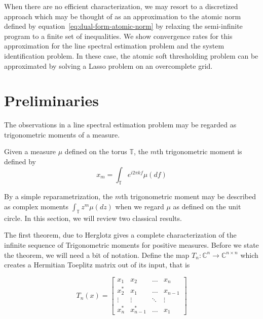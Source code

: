 When there are no efficient characterization, we may resort to a discretized
approach which may be thought of as an approximation to the atomic norm defined
by equation~\eqref{eq:dual-form-atomic-norm} by relaxing the semi-infinite
program to a finite set of inequalities. We show convergence rates for this
approximation for the line spectral estimation problem and the system
identification problem. In these case, the atomic soft thresholding problem can
be approximated by solving a Lasso problem on an overcomplete grid.


\section{Preliminaries} %
\label{sec:preliminaries}

The observations in a line spectral estimation problem may be regarded as
trigonometric moments of a measure. 

\begin{definition}
Given a measure $\mu$ defined on the torus $\mathbb{T}$, the $m$th
trigonometric moment is defined by
\begin{equation}
	\label{eq:trig-moment-measure}
	x_m = \int_\mathbb{T} e^{i 2 \pi k f} \mu ( d f)
\end{equation}
\end{definition}

By a simple reparametrization, the $m$th trigonometric moment may be described
as complex moments $\int_\mathbb{T} z^m \mu(dz)$ when we regard $\mu$ as defined
on the unit circle. In this section, we will review two classical results. 

The first theorem, due to Herglotz gives a complete characterization of the
infinite sequence of Trigonometric moments for positive measures. Before we
state the theorem, we will need a bit of notation. Define the map
$T_n:\mathbb{C}^n \rightarrow \mathbb{C}^{n\times n}$ which creates a Hermitian
Toeplitz matrix out of its input, that is

\[
T_n(x)= \left[
\begin{array}{ccccc} x_1 & x_2 & \ldots & x_n\\ 
x^*_2 & x_1  & \ldots & x_{n-1}\\
 \vdots & \vdots & \ddots & \vdots\\
 x^*_n & x^*_{n-1}  & \ldots & x_1
 \end{array}\right]
\]

